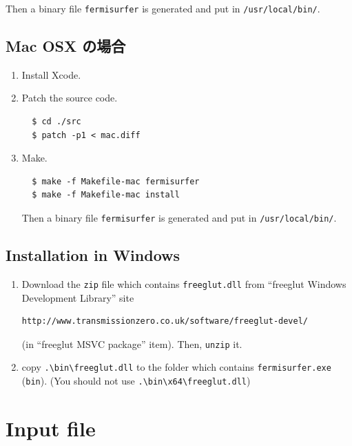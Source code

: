\documentclass[12pt]{article}
\begin{document}
Then a binary file \texttt{fermisurfer} is generated and put 
in \verb|/usr/local/bin/|.

\subsection{Mac OSX の場合}

\begin{enumerate}

\item Install Xcode.

\item Patch the source code.
\begin{verbatim}
  $ cd ./src
  $ patch -p1 < mac.diff
\end{verbatim}

\item Make.
\begin{verbatim}
  $ make -f Makefile-mac fermisurfer
  $ make -f Makefile-mac install
\end{verbatim}

Then a binary file \texttt{fermisurfer} is generated and put 
in \verb|/usr/local/bin/|.

\end{enumerate}

\subsection{Installation in Windows}
 
\begin{enumerate}

\item Download the \verb|zip| file which contains \verb|freeglut.dll|
from ``freeglut Windows Development Library'' site
\begin{verbatim}
http://www.transmissionzero.co.uk/software/freeglut-devel/
\end{verbatim}
(in ``freeglut MSVC package'' item).
Then, \verb|unzip| it.

\item copy \verb|.\bin\freeglut.dll| to the folder which contains
 \verb|fermisurfer.exe| (\verb|bin|).
 (You should not use \verb|.\bin\x64\freeglut.dll|)

\end{enumerate}

\section{Input file}
\end{document}
